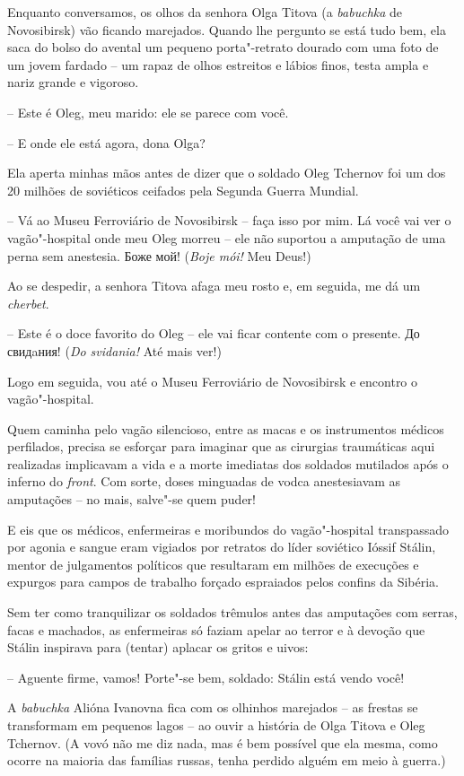 Enquanto conversamos, os olhos da senhora Olga Titova (a \emph{babuchka}
de Novosibirsk) vão ficando marejados. Quando lhe pergunto se está tudo
bem, ela saca do bolso do avental um pequeno porta"-retrato dourado com
uma foto de um jovem fardado -- um rapaz de olhos estreitos e lábios
finos, testa ampla e nariz grande e vigoroso.

-- Este é Oleg, meu marido: ele se parece com você.

-- E onde ele está agora, dona Olga?

Ela aperta minhas mãos antes de dizer que o soldado Oleg Tchernov foi um
dos 20 milhões de soviéticos ceifados pela Segunda Guerra Mundial.

-- Vá ao Museu Ferroviário de Novosibirsk -- faça isso por mim. Lá você
vai ver o vagão"-hospital onde meu Oleg morreu -- ele não suportou a
amputação de uma perna sem anestesia. Боже мой! (\emph{Boje mói!} Meu
Deus!)

Ao se despedir, a senhora Titova afaga meu rosto e, em seguida, me dá um
\emph{cherbet}.

-- Este é o doce favorito do Oleg -- ele vai ficar contente com o
presente. До свидaния! (\emph{Do svidania!} Até mais ver!)

Logo em seguida, vou até o Museu Ferroviário de Novosibirsk e encontro o
vagão"-hospital.

Quem caminha pelo vagão silencioso, entre as macas e os instrumentos
médicos perfilados, precisa se esforçar para imaginar que as cirurgias
traumáticas aqui realizadas implicavam a vida e a morte imediatas dos
soldados mutilados após o inferno do \emph{front}. Com sorte, doses
minguadas de vodca anestesiavam as amputações -- no mais, salve"-se quem
puder!

E eis que os médicos, enfermeiras e moribundos do vagão"-hospital
transpassado por agonia e sangue eram vigiados por retratos do líder
soviético Ióssif Stálin, mentor de julgamentos políticos que resultaram
em milhões de execuções e expurgos para campos de trabalho forçado
espraiados pelos confins da Sibéria.

Sem ter como tranquilizar os soldados trêmulos antes das amputações com
serras, facas e machados, as enfermeiras só faziam apelar ao terror e à
devoção que Stálin inspirava para (tentar) aplacar os gritos e uivos:

-- Aguente firme, vamos! Porte"-se bem, soldado: Stálin está vendo você!

A \emph{babuchka} Alióna Ivanovna fica com os olhinhos marejados -- as
frestas se transformam em pequenos lagos -- ao ouvir a história de Olga
Titova e Oleg Tchernov. (A vovó não me diz nada, mas é bem possível que
ela mesma, como ocorre na maioria das famílias russas, tenha perdido
alguém em meio à guerra.)

